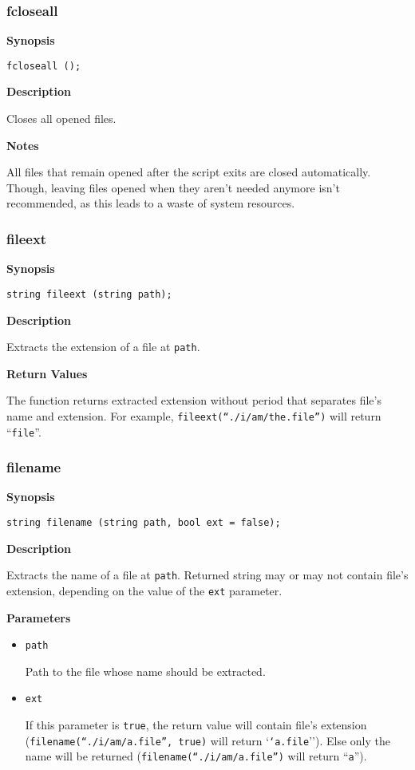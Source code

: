 \documentclass[a4paper, 10pt, titlepage]{article}
\begin{document}
\subsubsection{fcloseall}

\textbf{Synopsis}

\begin{verbatim}
fcloseall ();
\end{verbatim}

\textbf{Description}

Closes all opened files.

\textbf{Notes}

All files that remain opened after the script exits are closed automatically. Though, leaving files opened when they aren't needed anymore isn't recommended, as this leads to a waste of system resources.

\subsubsection{fileext}

\textbf{Synopsis}

\begin{verbatim}
string fileext (string path);
\end{verbatim}

\textbf{Description}

Extracts the extension of a file at \texttt{path}.

\textbf{Return Values}

The function returns extracted extension without period that separates file's name and extension. For example,
\texttt{fileext(``./i/am/the.file'')} will return ``\texttt{file}''.

\subsubsection{filename}

\textbf{Synopsis}

\begin{verbatim}
string filename (string path, bool ext = false);
\end{verbatim}

\textbf{Description}

Extracts the name of a file at \texttt{path}. Returned string may or may not contain file's extension, depending on the value of the \texttt{ext} parameter.

\textbf{Parameters}

\begin{itemize}
\item \texttt{path}

Path to the file whose name should be extracted.

\item \texttt{ext}

If this parameter is \texttt{true}, the return value will contain file's extension (\texttt{filename(``./i/am/a.file'', true)} will return `\texttt{`a.file}''). Else only the name will be returned (\texttt{filename(``./i/am/a.file'')} will return ``\texttt{a}'').
\end{itemize}
\end{document}
